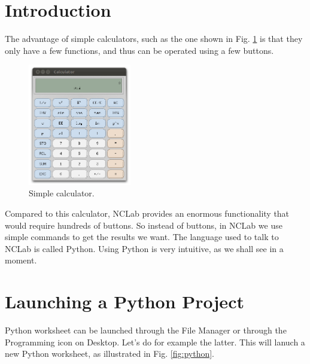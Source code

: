 \documentclass{article}
\begin{document}
\normalsize

\newpage
\setcounter{tocdepth}{2}
\tableofcontents

\newpage

\pagestyle{plain}
\setcounter{page}{1}


\newpage

\pagestyle{plain}


\section{Introduction}

The advantage of simple calculators, such as the one shown in Fig. \ref{fig:xcalc}
is that they only have a few functions, and thus can be operated using a few buttons.

\begin{figure}[!ht]
\begin{center}
\includegraphics[width=0.4\textwidth]{img/xcalc.png}
\end{center}
\caption{Simple calculator.}
\label{fig:xcalc}
\end{figure}
\noindent
Compared to this calculator, NCLab provides an enormous functionality 
that would require hundreds of buttons. So instead of buttons,
in NCLab we use simple commands to get the results we want. The language used 
to talk to NCLab is called Python. Using Python is very intuitive, 
as we shall see in a moment.

\section{Launching a Python Project}

Python worksheet can be launched through the File Manager or through 
the Programming icon on Desktop. Let's do for example the latter. 
This will lanuch a new Python worksheet, as illustrated in Fig. 
\ref{fig:python}. 
\end{document}
